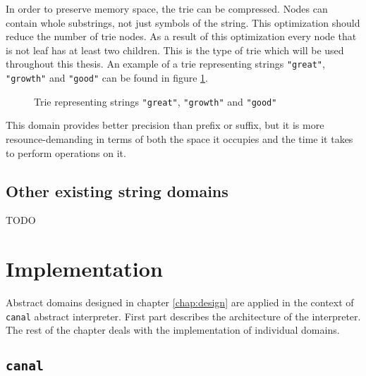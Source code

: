 \documentclass[12pt,final,oneside]{fithesis2}
\theoremstyle{definition}
\begin{document}
In order to preserve memory space, the trie can be compressed. Nodes can
contain whole substrings, not just symbols of the string. This optimization
should reduce the number of trie nodes. As a result of this optimization
every node that is not leaf has at least two children. This is the type of
trie which will be used throughout this thesis. An example of a trie
representing strings \texttt{"great"}, \texttt{"growth"} and \texttt{"good"}
can be found in figure \ref{fig:trie}.

\begin{figure}[ht]
\centering
{}
\caption{Trie representing strings \texttt{"great"}, \texttt{"growth"} and
  \texttt{"good"}}
\label{fig:trie}
\end{figure}

This domain provides better precision than prefix or suffix, but it is more
resounce-demanding in terms of both the space it occupies and the time it
takes to perform operations on it.


\section{Other existing string domains}
\label{sec:otherstringdomains}

TODO


\chapter{Implementation}
\label{chap:implementation}

Abstract domains designed in chapter \ref{chap:design} are applied in the
context of \texttt{canal} abstract interpreter. First part describes the
architecture of the interpreter. The rest of the chapter deals with the
implementation of individual domains.


\section{\texttt{canal}}
\end{document}
